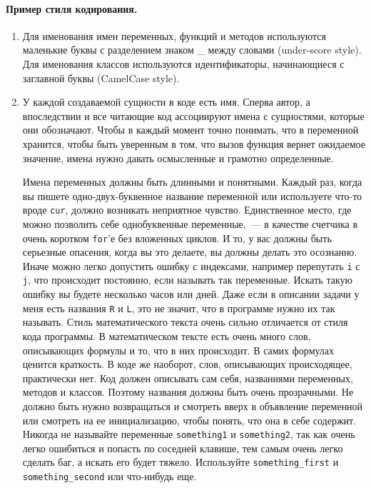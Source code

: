 \documentclass[a4paper,10pt]{article}
\begin{document}
\paragraph{Пример стиля кодирования.} 
\begin{enumerate}
    \item Для именования имен переменных, функций и методов используются 
        маленькие буквы с разделением знаком _ между словами (under-score style).
        Для именования классов используются идентификаторы, начинающиеся с
        заглавной буквы (CamelCase style).

    \item У каждой создаваемой сущности в коде есть имя. Сперва автор, а
        впоследствии и все читающие код ассоциируют имена с сущностями, которые
        они обозначают.  Чтобы в каждый момент точно понимать, что в переменной
        хранится, чтобы быть уверенным в том, что вызов функция вернет ожидаемое
        значение, имена нужно давать осмысленные и грамотно определенные.  
        
        Имена переменных должны быть длинными и понятными. Каждый раз, когда
        вы пишете одно-двух-буквенное название переменной или используете что-то
        вроде {\tt cur}, должно возникать неприятное чувство. Единственное место,
        где можно позволить себе однобуквенные переменные,~— в качестве счетчика
        в очень коротком {\tt for}’е без вложенных циклов. И то, у вас должны
        быть серьезные опасения, когда вы это делаете, вы должны делать это
        осознанно.  Иначе можно легко допустить ошибку с индексами, например
        перепутать {\tt i} с {\tt j}, что происходит постоянно, если называть так
        переменные. Искать такую ошибку вы будете несколько часов или дней. Даже
        если в описании задачи у меня есть названия {\tt R} и {\tt L}, это не значит, что в
        программе нужно их так называть. Стиль математического текста очень
        сильно отличается от стиля кода программы. В математическом тексте есть
        очень много слов, описывающих формулы и то, что в них происходит. В
        самих формулах ценится краткость.  В коде же наоборот, слов, описывающих
        происходящее, практически нет. Код должен описывать сам себя, названиями
        переменных, методов и классов. Поэтому названия должны быть очень
        прозрачными. Не должно быть нужно возвращаться и смотреть вверх в
        объявление переменной или смотреть на ее инициализацию, чтобы понять,
        что она в себе содержит. Никогда не называйте переменные {\tt something1} и
        {\tt something2}, так как очень легко ошибиться и попасть по соседней клавише,
        тем самым очень легко сделать баг, а искать его будет тяжело.
        Используйте {\tt something_first} и {\tt something_second} или что-нибудь еще.


\end{enumerate}
\end{document}
